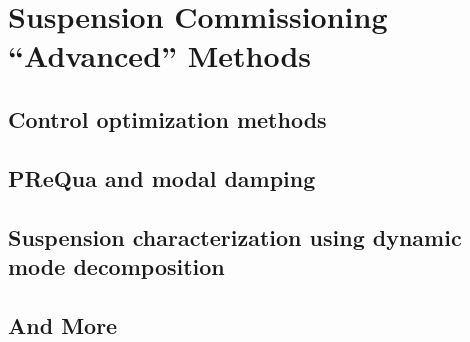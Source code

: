\section{Suspension Commissioning ``Advanced'' Methods \label{sec:suspension_commissioning_advanced_methods}}
\subsection{Control optimization methods}
\subsection{PReQua and modal damping}
\subsection{Suspension characterization using dynamic mode decomposition}
\subsection{And More}